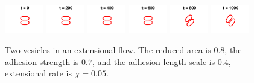 \documentclass[aps,prl,twocolumn,showpacs,amsmath,amssymb]{revtex4-1}
\begin{document}
\begin{figure}[htp]
  \includegraphics[width = 0.15\textwidth]{figs/extensional_adR4em1adS7em1Chi5em2_ra080_image01.png}
  \includegraphics[width = 0.15\textwidth]{figs/extensional_adR4em1adS7em1Chi5em2_ra080_image02.png}
  \includegraphics[width = 0.15\textwidth]{figs/extensional_adR4em1adS7em1Chi5em2_ra080_image03.png}
  \includegraphics[width = 0.15\textwidth]{figs/extensional_adR4em1adS7em1Chi5em2_ra080_image04.png}
  \includegraphics[width = 0.15\textwidth]{figs/extensional_adR4em1adS7em1Chi5em2_ra080_image05.png}
  \includegraphics[width = 0.15\textwidth]{figs/extensional_adR4em1adS7em1Chi5em2_ra080_image06.png}
  \caption{\label{fig:extensional2} Two vesicles in an extensional flow.
  The reduced area is $0.8$, the adhesion strength is $0.7$, and the
  adhesion length scale is $0.4$, extensional rate is $\chi = 0.05$.}
\end{figure}
\end{document}
